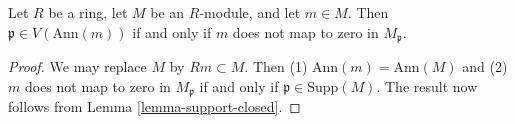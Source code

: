 \begin{lemma}
\label{lemma-support-element}
Let $R$ be a ring, let $M$ be an $R$-module, and let $m \in M$.
Then $\mathfrak p \in V(\text{Ann}(m))$ if and only if
$m$ does not map to zero in $M_\mathfrak p$.
\end{lemma}

\begin{proof}
We may replace $M$ by $Rm \subset M$. Then (1) $\text{Ann}(m) = \text{Ann}(M)$
and (2) $m$ does not map to zero in $M_\mathfrak p$ if and only if
$\mathfrak p \in \text{Supp}(M)$.
The result now follows from Lemma \ref{lemma-support-closed}.
\end{proof}